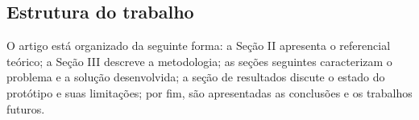 \subsection{Estrutura do trabalho}
O artigo está organizado da seguinte forma: a Seção II apresenta o referencial teórico; a Seção III descreve a metodologia; as seções seguintes caracterizam o problema e a solução desenvolvida; a seção de resultados discute o estado do protótipo e suas limitações; por fim, são apresentadas as conclusões e os trabalhos futuros.
